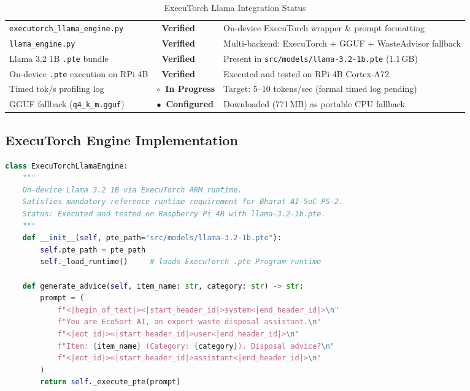 \documentclass[12pt,a4paper]{article}
\newcommand{\verified}{{\color{statusgreen}\textbf{\checkmark~Verified}}}
\newcommand{\configured}{{\color{statusblue}\textbf{$\bullet$~Configured}}}
\newcommand{\inprogress}{{\color{statusamber}\textbf{$\circ$~In Progress}}}
\begin{document}
\renewcommand{\arraystretch}{1.30}
\begin{table}[H]
\centering
\caption{ExecuTorch Llama Integration Status}
\label{tab:executorch_status}
\small
\begin{tabularx}{\linewidth}{@{} L{5.8cm} C{2.6cm} X @{}}
\toprule
{} &  &  \\
\midrule
{}
{\footnotesize\texttt{executorch\_llama\_engine.py}} & \verified & On-device ExecuTorch wrapper \& prompt formatting \\
{\footnotesize\texttt{llama\_engine.py}}           & \verified & Multi-backend: ExecuTorch + GGUF + WasteAdvisor fallback \\
Llama 3.2 1B \texttt{.pte} bundle                   & \verified & Present in \texttt{src/models/llama-3.2-1b.pte} (1.1\,GB) \\
On-device \texttt{.pte} execution on RPi 4B         & \verified & Executed and tested on RPi 4B Cortex-A72 \\
Timed tok/s profiling log                           & \inprogress & Target: 5--10 tokens/sec (formal timed log pending) \\
GGUF fallback (\texttt{q4\_k\_m.gguf})              & \configured & Downloaded (771\,MB) as portable CPU fallback \\
\bottomrule
\end{tabularx}
\end{table}

\subsection{ExecuTorch Engine Implementation}

\begin{lstlisting}[language=python, caption={ExecuTorch Llama Engine --- implemented in src/executorch\_llama\_engine.py}]
class ExecuTorchLlamaEngine:
    """
    On-device Llama 3.2 1B via ExecuTorch ARM runtime.
    Satisfies mandatory reference runtime requirement for Bharat AI-SoC PS-2.
    Status: Executed and tested on Raspberry Pi 4B with llama-3.2-1b.pte.
    """
    def __init__(self, pte_path="src/models/llama-3.2-1b.pte"):
        self.pte_path = pte_path
        self._load_runtime()     # loads ExecuTorch .pte Program runtime

    def generate_advice(self, item_name: str, category: str) -> str:
        prompt = (
            f"<|begin_of_text|><|start_header_id|>system<|end_header_id|>\n"
            f"You are EcoSort AI, an expert waste disposal assistant.\n"
            f"<|eot_id|><|start_header_id|>user<|end_header_id|>\n"
            f"Item: {item_name} (Category: {category}). Disposal advice?\n"
            f"<|eot_id|><|start_header_id|>assistant<|end_header_id|>\n"
        )
        return self._execute_pte(prompt)
\end{lstlisting}
\end{document}
